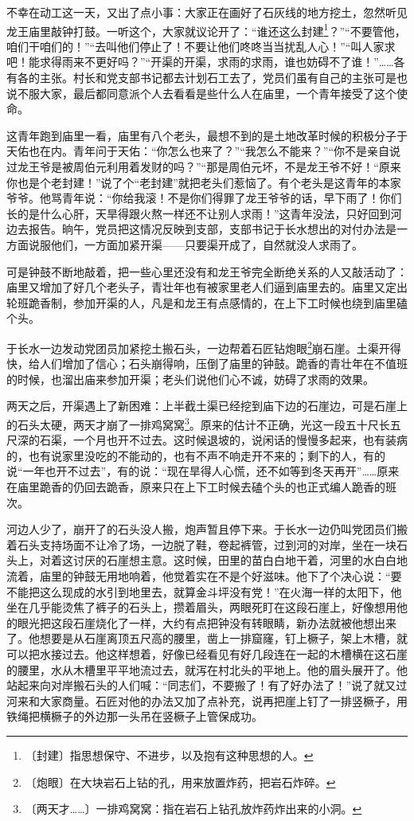 \documentclass[12pt,UTF-8,openany]{ctexbook}
\begin{document}
\begin{normalsize}
    不幸在动工这一天，又出了点小事：大家正在画好了石灰线的地方挖土，忽然听见龙王庙里敲钟打鼓。一听这个，大家就议论开了：“谁还这么封建\footnote{〔封建〕指思想保守、不进步，以及抱有这种思想的人。}？”“不要管他，咱们干咱们的！”“去叫他们停止了！不要让他们咚咚当当扰乱人心！”“叫人家求吧！能求得雨来不更好吗？”“开渠的开渠，求雨的求雨，谁也妨碍不了谁！”……各有各的主张。村长和党支部书记都去计划石工去了，党员们虽有自己的主张可是也说不服大家，最后都同意派个人去看看是些什么人在庙里，一个青年接受了这个使命。
    
    这青年跑到庙里一看，庙里有八个老头，最想不到的是土地改革时候的积极分子于天佑也在内。青年问于天佑：“你怎么也来了？”“我怎么不能来？”“你不是亲自说过龙王爷是被周伯元利用着发财的吗？”“那是周伯元坏，不是龙王爷不好！“原来你也是个老封建！”说了个“老封建”就把老头们惹恼了。有个老头是这青年的本家爷爷。他骂青年说：“你给我滚！不是你们得罪了龙王爷爷的话，早下雨了！你们长的是什么心肝，天旱得跟火熬一样还不让别人求雨！”这青年没法，只好回到河边去报告。晌午，党员把这情况反映到支部，支部书记于长水想出的对付办法是一方面说服他们，一方面加紧开渠——只要渠开成了，自然就没人求雨了。
    
    可是钟鼓不断地敲着，把一些心里还没有和龙王爷完全断绝关系的人又敲活动了：庙里又增加了好几个老头子，青壮年也有被家里老人们逼到庙里去的。庙里又定出轮班跪香制，参加开渠的人，凡是和龙王有点感情的，在上下工时候也绕到庙里磕个头。
    
    于长水一边发动党团员加紧挖土搬石头，一边帮着石匠钻炮眼\footnote{〔炮眼〕在大块岩石上钻的孔，用来放置炸药，把岩石炸碎。}崩石崖。土渠开得快，给人们增加了信心；石头崩得响，压倒了庙里的钟鼓。跪香的青壮年在不值班的时候，也溜出庙来参加开渠；老头们说他们心不诚，妨碍了求雨的效果。
    
    两天之后，开渠遇上了新困难：上半截土渠已经挖到庙下边的石崖边，可是石崖上的石头太硬，两天才崩了一排鸡窝窝\footnote{〔两天才……〕一排鸡窝窝：指在岩石上钻孔放炸药炸出来的小洞。}。原来的估计不正确，光这一段五十尺长五尺深的石渠，一个月也开不过去。这时候退坡的，说闲话的慢慢多起来，也有装病的，也有说家里没吃的不能动的，也有不声不响走开不来的；剩下的人，有的说“一年也开不过去”，有的说：“现在旱得人心慌，还不如等到冬天再开”……原来在庙里跪香的仍回去跪香，原来只在上下工时候去磕个头的也正式编人跪香的班次。
    
    河边人少了，崩开了的石头没人搬，炮声暂且停下来。于长水一边仍叫党团员们搬着石头支持场面不让冷了场，一边脱了鞋，卷起裤管，过到河的对岸，坐在一块石头上，对着这讨厌的石崖想主意。这时候，田里的苗白白地干着，河里的水白白地流着，庙里的钟鼓无用地响着，他觉着实在不是个好滋味。他下了个决心说：“要不能把这么现成的水引到地里去，就算金斗坪没有党！”在火海一样的太阳下，他坐在几乎能烫焦了裤子的石头上，攒着眉头，两眼死盯在这段石崖上，好像想用他的眼光把这段石崖烧化了一样，大约有点把钟没有转眼睛，新办法就被他想出来了。他想要是从石崖离顶五尺高的腰里，凿上一排窟窿，钉上橛子，架上木槽，就可以把水接过去。他这样想着，好像已经看见有好几段连在一起的木槽横在这石崖的腰里，水从木槽里平平地流过去，就泻在村北头的平地上。他的眉头展开了。他站起来向对岸搬石头的人们喊：“同志们，不要搬了！有了好办法了！”说了就又过河来和大家商量。石匠对他的办法又加了点补充，说再把崖上钉了一排竖橛子，用铁绳把横橛子的外边那一头吊在竖橛子上管保成功。
    

\end{normalsize}
\end{document}
